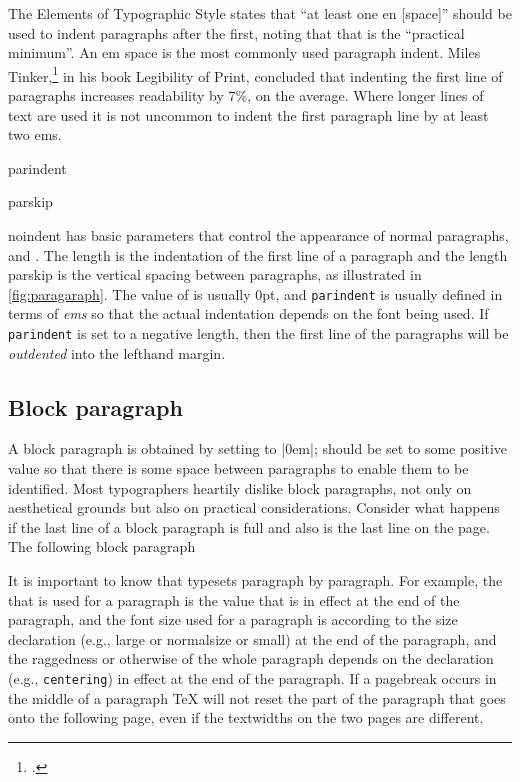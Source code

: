 The Elements of Typographic Style states that \enquote{at least one en [space]} should be used to indent paragraphs after the first, noting that that is the \enquote{practical minimum}. An em space is the most commonly used paragraph indent. Miles Tinker,\footcite{tinker1963} in his book Legibility of Print, concluded that indenting the first line of paragraphs increases readability by 7\%, on the average. Where longer lines of text are used it is not uncommon to indent the first paragraph line by at least two ems.

\begin{docCommand}{parindent} {  }
\begin{docCommand}{parskip} {}
\begin{docCommand}{noindent}{}
\LaTeXe has basic parameters that control the appearance of normal paragraphs,
 and  .
The length   is the indentation of the first line of a paragraph and the length
parskip is the vertical spacing between paragraphs, as illustrated in \ref{fig:paragaraph}. The
value of  is usually 0pt, and \texttt{parindent} is usually defined in terms of \textit{ems}
so that the actual indentation depends on the font being used. If \texttt{parindent} is set to a
negative length, then the first line of the paragraphs will be \textit{outdented} into the lefthand
margin.
\end{docCommand}
\end{docCommand}
\end{docCommand}



\subsection{Block paragraph}

A block paragraph is obtained by setting  to |0em|;  should be set to
some positive value so that there is some space between paragraphs to enable them to be
identified. Most typographers heartily dislike block paragraphs, not only on aesthetical
grounds but also on practical considerations. Consider what happens if the last line of a
block paragraph is full and also is the last line on the page. The following block paragraph

It is important to know that \latex typesets paragraph by paragraph. For example, the
 that is used for a paragraph is the value that is in effect at the end of the
paragraph, and the font size used for a paragraph is according to the size declaration (e.g.,
large or normalsize or small) at the end of the paragraph, and the raggedness or
otherwise of the whole paragraph depends on the declaration (e.g., \texttt{centering}) in effect
at the end of the paragraph. If a pagebreak occurs in the middle of a paragraph TeX will
not reset the part of the paragraph that goes onto the following page, even if the textwidths
on the two pages are different.


